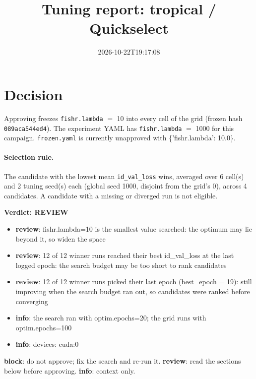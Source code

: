 \documentclass[10pt]{article}
\title{Tuning report: tropical / Quickselect}
\date{2026-10-22T19:17:08}
\begin{document}
\maketitle

\section{Decision}
Approving freezes
\texttt{fishr.lambda} $=$ 10 into every cell of the grid (frozen hash \texttt{089aca544ed4}).
The experiment YAML has
\texttt{fishr.lambda} $=$ 1000 for this campaign.
\texttt{frozen.yaml} is currently unapproved with \{'fishr.lambda': 10.0\}.

\paragraph{Selection rule.} The candidate with the lowest mean \texttt{id\_val\_loss} wins, averaged over 6 cell(s) and 2 tuning seed(s) each (global seed 1000, disjoint from the grid's 0), across 4 candidates. A candidate with a missing or diverged run is not eligible.

\begin{framed}
\noindent\textbf{Verdict: \textcolor{orange!85!black}{REVIEW}}
\begin{itemize}\setlength\itemsep{0pt}
\item \textbf{review}: fishr.lambda=10 is the smallest value searched: the optimum may lie beyond it, so widen the space
\item \textbf{review}: 12 of 12 winner runs reached their best id\_val\_loss at the last logged epoch: the search budget may be too short to rank candidates
\item \textbf{review}: 12 of 12 winner runs picked their last epoch (best\_epoch = 19): still improving when the search budget ran out, so candidates were ranked before converging
\item \textbf{info}: the search ran with optim.epochs=20; the grid runs with optim.epochs=100
\item \textbf{info}: devices: cuda:0
\end{itemize}
\end{framed}
\noindent\textbf{block}: do not approve; fix the search and re-run it. \textbf{review}: read the sections below before approving. \textbf{info}: context only.
\end{document}
